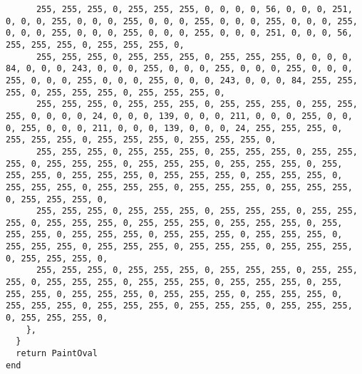 \documentclass{ctexart}
\begin{document}
\begin{lstlisting}
      255, 255, 255, 0, 255, 255, 255, 0, 0, 0, 0, 56, 0, 0, 0, 251, 0, 0, 0, 255, 0, 0, 0, 255, 0, 0, 0, 255, 0, 0, 0, 255, 0, 0, 0, 255, 0, 0, 0, 255, 0, 0, 0, 255, 0, 0, 0, 255, 0, 0, 0, 251, 0, 0, 0, 56, 255, 255, 255, 0, 255, 255, 255, 0, 
      255, 255, 255, 0, 255, 255, 255, 0, 255, 255, 255, 0, 0, 0, 0, 84, 0, 0, 0, 243, 0, 0, 0, 255, 0, 0, 0, 255, 0, 0, 0, 255, 0, 0, 0, 255, 0, 0, 0, 255, 0, 0, 0, 255, 0, 0, 0, 243, 0, 0, 0, 84, 255, 255, 255, 0, 255, 255, 255, 0, 255, 255, 255, 0, 
      255, 255, 255, 0, 255, 255, 255, 0, 255, 255, 255, 0, 255, 255, 255, 0, 0, 0, 0, 24, 0, 0, 0, 139, 0, 0, 0, 211, 0, 0, 0, 255, 0, 0, 0, 255, 0, 0, 0, 211, 0, 0, 0, 139, 0, 0, 0, 24, 255, 255, 255, 0, 255, 255, 255, 0, 255, 255, 255, 0, 255, 255, 255, 0, 
      255, 255, 255, 0, 255, 255, 255, 0, 255, 255, 255, 0, 255, 255, 255, 0, 255, 255, 255, 0, 255, 255, 255, 0, 255, 255, 255, 0, 255, 255, 255, 0, 255, 255, 255, 0, 255, 255, 255, 0, 255, 255, 255, 0, 255, 255, 255, 0, 255, 255, 255, 0, 255, 255, 255, 0, 255, 255, 255, 0, 255, 255, 255, 0, 
      255, 255, 255, 0, 255, 255, 255, 0, 255, 255, 255, 0, 255, 255, 255, 0, 255, 255, 255, 0, 255, 255, 255, 0, 255, 255, 255, 0, 255, 255, 255, 0, 255, 255, 255, 0, 255, 255, 255, 0, 255, 255, 255, 0, 255, 255, 255, 0, 255, 255, 255, 0, 255, 255, 255, 0, 255, 255, 255, 0, 255, 255, 255, 0, 
      255, 255, 255, 0, 255, 255, 255, 0, 255, 255, 255, 0, 255, 255, 255, 0, 255, 255, 255, 0, 255, 255, 255, 0, 255, 255, 255, 0, 255, 255, 255, 0, 255, 255, 255, 0, 255, 255, 255, 0, 255, 255, 255, 0, 255, 255, 255, 0, 255, 255, 255, 0, 255, 255, 255, 0, 255, 255, 255, 0, 255, 255, 255, 0, 
    },
  }
  return PaintOval
end


\end{lstlisting}
\end{document}
